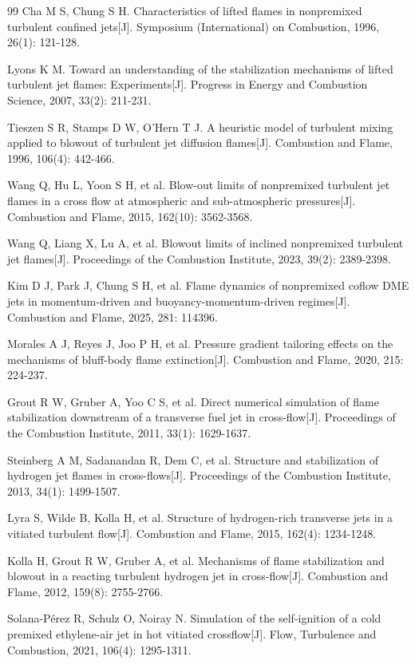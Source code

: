 \documentclass[master]{sdustthesis}  %
\begin{document}
\begin{thebibliography}{99}
	 Cha M S, Chung S H. Characteristics of lifted flames in nonpremixed turbulent confined jets[J]. Symposium (International) on Combustion, 1996, 26(1): 121-128.
	
	 Lyons K M. Toward an understanding of the stabilization mechanisms of lifted turbulent jet flames: Experiments[J]. Progress in Energy and Combustion Science, 2007, 33(2): 211-231.
	
	 Tieszen S R, Stamps D W, O'Hern T J. A heuristic model of turbulent mixing applied to blowout of turbulent jet diffusion flames[J]. Combustion and Flame, 1996, 106(4): 442-466.
	
	 Wang Q, Hu L, Yoon S H, et al. Blow-out limits of nonpremixed turbulent jet flames in a cross flow at atmospheric and sub-atmospheric pressures[J]. Combustion and Flame, 2015, 162(10): 3562-3568.
	
	 Wang Q, Liang X, Lu A, et al. Blowout limits of inclined nonpremixed turbulent jet flames[J]. Proceedings of the Combustion Institute, 2023, 39(2): 2389-2398.
	
	 Kim D J, Park J, Chung S H, et al. Flame dynamics of nonpremixed coflow DME jets in momentum-driven and buoyancy-momentum-driven regimes[J]. Combustion and Flame, 2025, 281: 114396.
	
	 Morales A J, Reyes J, Joo P H, et al. Pressure gradient tailoring effects on the mechanisms of bluff-body flame extinction[J]. Combustion and Flame, 2020, 215: 224-237.
	
	 Grout R W, Gruber A, Yoo C S, et al. Direct numerical simulation of flame stabilization downstream of a transverse fuel jet in cross-flow[J]. Proceedings of the Combustion Institute, 2011, 33(1): 1629-1637.
	
	 Steinberg A M, Sadanandan R, Dem C, et al. Structure and stabilization of hydrogen jet flames in cross-flows[J]. Proceedings of the Combustion Institute, 2013, 34(1): 1499-1507.
	
	 Lyra S, Wilde B, Kolla H, et al. Structure of hydrogen-rich transverse jets in a vitiated turbulent flow[J]. Combustion and Flame, 2015, 162(4): 1234-1248.
	
	 Kolla H, Grout R W, Gruber A, et al. Mechanisms of flame stabilization and blowout in a reacting turbulent hydrogen jet in cross-flow[J]. Combustion and Flame, 2012, 159(8): 2755-2766.
	
	 Solana-Pérez R, Schulz O, Noiray N. Simulation of the self-ignition of a cold premixed ethylene-air jet in hot vitiated crossflow[J]. Flow, Turbulence and Combustion, 2021, 106(4): 1295-1311.
	
\end{thebibliography}


\backmatter


%

\begin{dataset}
\end{dataset}
\end{document}
